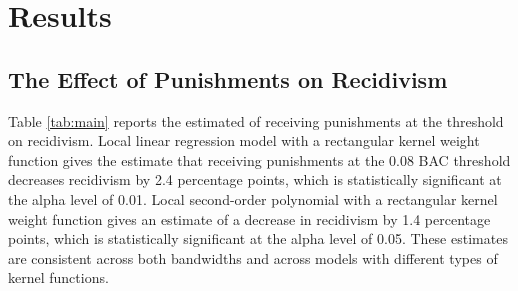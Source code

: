 \documentclass[
  11pt,
]{article}
\begin{document}
\endgroup

\hypertarget{results}{%
\section{Results}\label{results}}

\hypertarget{the-effect-of-punishments-on-recidivism}{%
\subsection{The Effect of Punishments on
Recidivism}\label{the-effect-of-punishments-on-recidivism}}

Table \ref{tab:main} reports the estimated of receiving punishments at
the threshold on recidivism. Local linear regression model with a
rectangular kernel weight function gives the estimate that receiving
punishments at the 0.08 BAC threshold decreases recidivism by 2.4
percentage points, which is statistically significant at the alpha level
of 0.01. Local second-order polynomial with a rectangular kernel weight
function gives an estimate of a decrease in recidivism by 1.4 percentage
points, which is statistically significant at the alpha level of 0.05.
These estimates are consistent across both bandwidths and across models
with different types of kernel functions.

\begingroup
\renewcommand{\arraystretch}{1.1}
\end{document}
